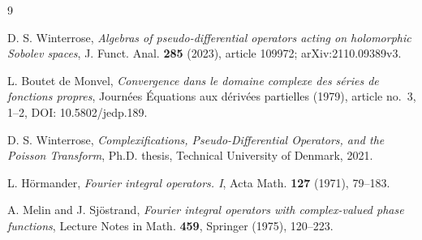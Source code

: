 \documentclass[11pt]{article}
\theoremstyle{remark}
\begin{document}
\begin{thebibliography}{9}
\small
\setlength{\itemsep}{0pt}

D. S. Winterrose,
\emph{Algebras of pseudo-differential operators acting on holomorphic Sobolev
spaces}, J. Funct. Anal. \textbf{285} (2023), article 109972;
arXiv:2110.09389v3.

L. Boutet de Monvel,
\emph{Convergence dans le domaine complexe des s\'eries de fonctions propres},
Journ\'ees \'Equations aux d\'eriv\'ees partielles (1979), article no.~3,
1--2, DOI: 10.5802/jedp.189.

D. S. Winterrose,
\emph{Complexifications, Pseudo-Differential Operators, and the Poisson
Transform}, Ph.D. thesis, Technical University of Denmark, 2021.

L. H\"ormander,
\emph{Fourier integral operators. I}, Acta Math. \textbf{127} (1971), 79--183.

A. Melin and J. Sj\"ostrand,
\emph{Fourier integral operators with complex-valued phase functions},
Lecture Notes in Math. \textbf{459}, Springer (1975), 120--223.

\end{thebibliography}
\end{document}
